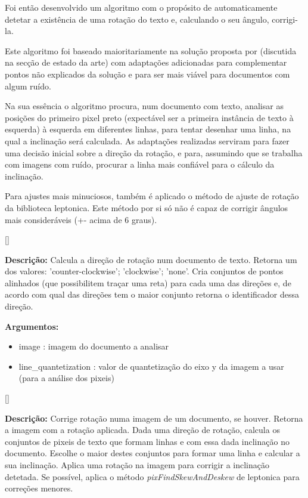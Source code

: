 
Foi então desenvolvido um algoritmo com o propósito de automaticamente detetar a existência de uma rotação do texto e, calculando o seu ângulo, corrigi-la. 

Este algoritmo foi baseado maioritariamente na solução proposta por \cite{4283429} (discutida na secção de estado da arte) com adaptações adicionadas para complementar pontos não explicados da solução e para ser mais viável para documentos com algum ruído.

Na sua essência o algoritmo procura, num documento com texto, analisar as posições do primeiro pixel preto (expectável ser a primeira instância de texto à esquerda) à esquerda em diferentes linhas, para tentar desenhar uma linha, na qual a inclinação será calculada. As adaptações realizadas serviram para fazer uma decisão inicial sobre a direção da rotação, e para, assumindo que se trabalha com imagens com ruído, procurar a linha mais confiável para o cálculo da inclinação.

Para ajustes mais minuciosos, também é aplicado o método de ajuste de rotação da biblioteca leptonica. Este método por si só não é capaz de corrigir ângulos mais consideráveis (+- acima de 6 graus).



[\normalsize]

\textbf{Descrição:} Calcula a direção de rotação num documento de texto. Retorna um dos valores: 'counter-clockwise'; 'clockwise'; 'none'. Cria conjuntos de pontos alinhados (que possibilitem traçar uma reta) para cada uma das direções e, de acordo com qual das direções tem o maior conjunto retorna o identificador dessa direção.

\textbf{Argumentos:}
\begin{itemize}\setlength\itemsep{-0.3em}
	\item image : imagem do documento a analisar
	\item line\_quantetization : valor de quantetização do eixo y da imagem a usar (para a análise dos pixeis) 
\end{itemize}

[\normalsize]

\textbf{Descrição:} Corrige rotação numa imagem de um documento, se houver. Retorna a imagem com a rotação aplicada. Dada uma direção de rotação, calcula os conjuntos de pixeis de texto que formam linhas e com essa dada inclinação no documento. Escolhe o maior destes conjuntos para formar uma linha e calcular a sua inclinação. Aplica uma rotação na imagem para corrigir a inclinação detetada. 
Se possível, aplica o método \textit{pixFindSkewAndDeskew} de leptonica para correções menores.

